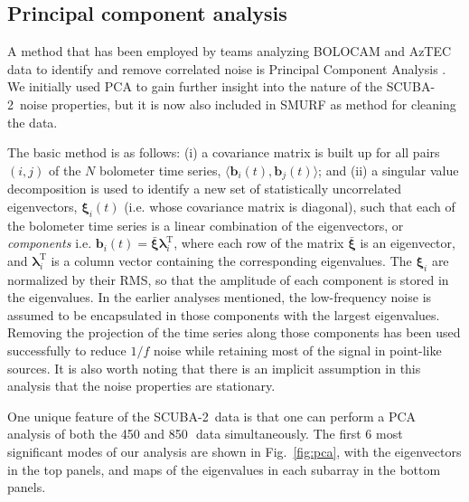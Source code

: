 \documentclass[useAMS,usenatbib,nofootinbib]{mn2e}
\newcommand{\scuba}{SCUBA-2}
\newcommand{\rms}{RMS}
\begin{document}
\subsection{Principal component analysis}
\label{sec:pca}

A method that has been employed by teams analyzing BOLOCAM and AzTEC
data to identify and remove correlated noise is Principal Component
Analysis \citep[PCA,][]{laurent2005,scott2008}. We initially used PCA
to gain further insight into the nature of the \scuba\ noise
properties, but it is now also included in SMURF as method for
cleaning the data.

The basic method is as follows: (i) a covariance matrix is built up
for all pairs $(i,j)$ of the $N$ bolometer time series,
$\langle\mathbf{b}_i(t),\mathbf{b}_j(t)\rangle$; and (ii) a singular
value decomposition is used to identify a new set of statistically
uncorrelated eigenvectors, $\mathbf{\xi}_i(t)$ (i.e. whose covariance
matrix is diagonal), such that each of the bolometer time series is a
linear combination of the eigenvectors, or \emph{components}
i.e. $\mathbf{b}_i(t) = \bar{\mathbf{\xi}}
\mathbf{\lambda}_i^\mathrm{T}$, where each row of the matrix
$\bar{\mathbf{\xi}}$ is an eigenvector, and
$\mathbf{\lambda}_i^\mathrm{T}$ is a column vector containing the
corresponding eigenvalues. The $\mathbf{\xi}_i$ are normalized by
their \rms, so that the amplitude of each component is stored in the
eigenvalues. In the earlier analyses mentioned, the low-frequency
noise is assumed to be encapsulated in those components with the
largest eigenvalues. Removing the projection of the time series along
those components has been used successfully to reduce $1/f$ noise
while retaining most of the signal in point-like sources. It is also
worth noting that there is an implicit assumption in this analysis
that the noise properties are stationary.

One unique feature of the \scuba\ data is that one can perform a PCA
analysis of both the 450 and 850\,\micron\ data simultaneously. The
first 6 most significant modes of our analysis are shown in
Fig.~\ref{fig:pca}, with the eigenvectors in the top panels, and maps
of the eigenvalues in each subarray in the bottom panels.
\end{document}
